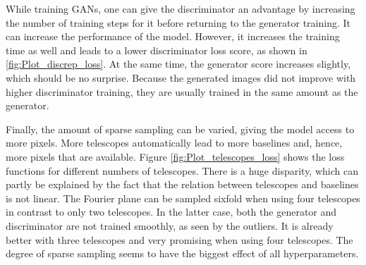 While training GANs, one can give the discriminator an advantage by increasing the number of training steps for it before returning to the generator training. It can increase the performance of the model. However, it increases the training time as well and leads to a lower discriminator loss score, as shown in \ref{fig:Plot_discrep_loss}. At the same time, the generator score increases slightly, which should be no surprise. Because the generated images did not improve with higher discriminator training, they are usually trained in the same amount as the generator.

Finally, the amount of sparse sampling can be varied, giving the model access to more pixels. More telescopes automatically lead to more baselines and, hence, more pixels that are available. Figure \ref{fig:Plot_telescopes_loss} shows the loss functions for different numbers of telescopes. There is a huge disparity, which can partly be explained by the fact that the relation between telescopes and baselines is not linear. The Fourier plane can be sampled sixfold when using four telescopes in contrast to only two telescopes. In the latter case, both the generator and discriminator are not trained smoothly, as seen by the outliers. It is already better with three telescopes and very promising when using four telescopes. The degree of sparse sampling seems to have the biggest effect of all hyperparameters. 
